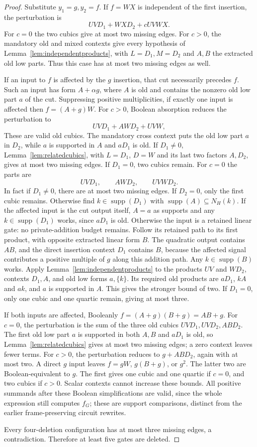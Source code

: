 \documentclass[11pt]{article}
\newcommand{\supp}{\operatorname{supp}}
\theoremstyle{definition}
\theoremstyle{remark}
\begin{document}
\begin{proof}
Substitute $y_1=g,y_2=f$. If $f=WX$ is independent of the first insertion, the perturbation is
\[
 UVD_1+WXD_2+c UVWX.
\]
For $c=0$ the two cubics give at most two missing edges. For $c>0$, the mandatory old and mixed contexts give every hypothesis of Lemma~\ref{lem:independentproducts}, with $L=D_1,M=D_2$ and $A,B$ the extracted old low parts. Thus this case has at most two missing edges as well.

If an input to $f$ is affected by the $g$ insertion, that cut necessarily precedes $f$. Such an input has form $A+\alpha g$, where $A$ is old and contains the nonzero old low part $a$ of the cut. Suppressing positive multiplicities, if exactly one input is affected then $f=(A+g)W$. For $c>0$, Boolean absorption reduces the perturbation to
\[
 UVD_1+AWD_2+UVW,
\]
These are valid old cubics. The mandatory cross context puts the old low part $a$ in $D_2$, while $a$ is supported in $A$ and $aD_1$ is old. If $D_1\ne0$, Lemma~\ref{lem:relatedcubics}, with $L=D_1$, $D=W$ and its last two factors $A,D_2$, gives at most two missing edges. If $D_1=0$, two cubics remain. For $c=0$ the parts are
\[
 UVD_1,\qquad AWD_2,\qquad UVWD_2.
\]
In fact if $D_1\ne0$, there are at most two missing edges. If $D_2=0$, only the first cubic remains. Otherwise find $k\in\supp(D_1)$ with $\supp(A)\subseteq N_H(k)$. If the affected input is the cut output itself, $A=a$ as supports and any $k\in\supp(D_1)$ works, since $aD_1$ is old. Otherwise the input is a retained linear gate: no private-addition budget remains. Follow its retained path to its first product, with opposite extracted linear form $B$. The quadratic output contains $AB$, and the direct insertion context $D_1$ contains $B$, because the affected signal contributes a positive multiple of $g$ along this addition path. Any $k\in\supp(B)$ works. Apply Lemma~\ref{lem:independentproducts} to the products $UV$ and $WD_2$, contexts $D_1,A$, and old low forms $a,\{k\}$. Its required old products are $aD_1$, $kA$ and $ak$, and $a$ is supported in $A$. This gives the stronger bound of two. If $D_1=0$, only one cubic and one quartic remain, giving at most three.

If both inputs are affected, Booleanly $f=(A+g)(B+g)=AB+g$. For $c=0$, the perturbation is the sum of the three old cubics $UVD_1,UVD_2,ABD_2$. The first old low part $a$ is supported in both $A,B$ and $aD_1$ is old, so Lemma~\ref{lem:relatedcubics} gives at most two missing edges; a zero context leaves fewer terms. For $c>0$, the perturbation reduces to $g+ABD_2$, again with at most two. A direct $g$ input leaves $f=gW$, $g(B+g)$, or $g^2$. The latter two are Boolean-equivalent to $g$. The first gives one cubic and one quartic if $c=0$, and two cubics if $c>0$. Scalar contexts cannot increase these bounds. All positive summands after these Boolean simplifications are valid, since the whole expression still computes $f_G$; these are support comparisons, distinct from the earlier frame-preserving circuit rewrites.

Every four-deletion configuration has at most three missing edges, a contradiction. Therefore at least five gates are deleted.
\end{proof}
\end{document}
